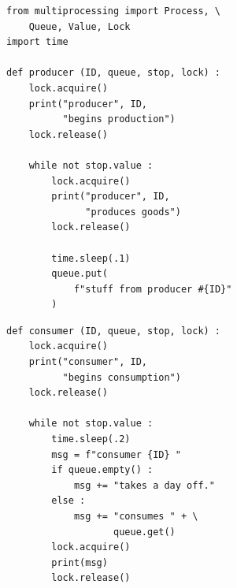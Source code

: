 \begin{frame}[fragile]
%
\begin{tcbraster}[raster columns=2,
                  raster equal height,
                  nobeforeafter,
                  raster column skip=0.5cm]
\begin{codebox}
\begin{verbatim}
from multiprocessing import Process, \
    Queue, Value, Lock
import time

def producer (ID, queue, stop, lock) :
    lock.acquire()
    print("producer", ID,
          "begins production")
    lock.release()
    
    while not stop.value :
        lock.acquire()
        print("producer", ID,
              "produces goods")
        lock.release()
        
        time.sleep(.1)
        queue.put(
            f"stuff from producer #{ID}"
        )
\end{verbatim}
\end{codebox}
%
\begin{codebox}[(... continued)]
\begin{verbatim}
def consumer (ID, queue, stop, lock) :
    lock.acquire()
    print("consumer", ID,
          "begins consumption")
    lock.release()
    
    while not stop.value :
        time.sleep(.2)
        msg = f"consumer {ID} "
        if queue.empty() :
            msg += "takes a day off."
        else :
            msg += "consumes " + \
                   queue.get()
        lock.acquire()
        print(msg)
        lock.release()
\end{verbatim}
\end{codebox}
\end{tcbraster}
%
\end{frame}



